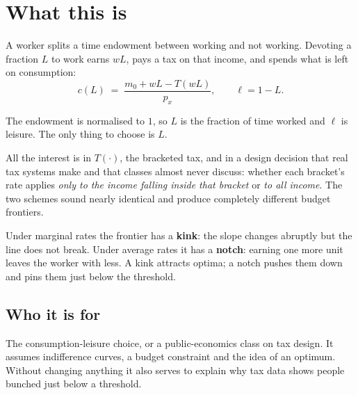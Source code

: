 \documentclass[11pt,a4paper]{appletmanual}
\begin{document}

\manualtoc
\thispagestyle{empty}
\clearpage
\setcounter{page}{1}

\section{What this is}

A worker splits a time endowment between working and not working. Devoting a
fraction $L$ to work earns $wL$, pays a tax on that income, and spends what is
left on consumption:
\[
  c(L) \;=\; \frac{m_0 + wL - T(wL)}{p_x},
  \qquad \ell = 1 - L .
\]

The endowment is normalised to $1$, so $L$ is the fraction of time worked and
$\ell$ is leisure. The only thing to choose is $L$.

All the interest is in $T(\cdot)$, the bracketed tax, and in a design decision
that real tax systems make and that classes almost never discuss: whether each
bracket's rate applies \emph{only to the income falling inside that bracket} or
\emph{to all income}. The two schemes sound nearly identical and produce
completely different budget frontiers.


\begin{amkey}
Under marginal rates the frontier has a \textbf{kink}: the slope changes
abruptly but the line does not break. Under average rates it has a
\textbf{notch}: earning one more unit leaves the worker with less. A kink
attracts optima; a notch pushes them down and pins them just below the
threshold.
\end{amkey}

\subsection{Who it is for}

The consumption-leisure choice, or a public-economics class on tax design. It
assumes indifference curves, a budget constraint and the idea of an optimum.
Without changing anything it also serves to explain why tax data shows people
bunched just below a threshold.
\end{document}
